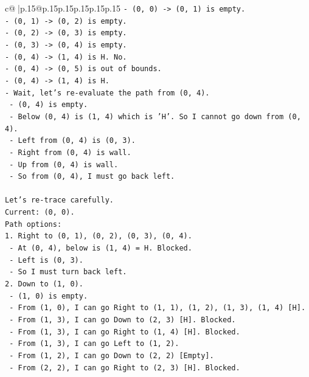 \documentclass{article}
\begin{document}
{\begin{supertabular}{c@{$\;$}|p{.15\linewidth}@{}p{.15\linewidth}p{.15\linewidth}p{.15\linewidth}p{.15\linewidth}p{.15\linewidth}}
{{{\texttt{{-} (0, 0) {-}> (0, 1) is empty.} \\
\texttt{{-} (0, 1) {-}> (0, 2) is empty.} \\
\texttt{{-} (0, 2) {-}> (0, 3) is empty.} \\
\texttt{{-} (0, 3) {-}> (0, 4) is empty.} \\
\texttt{{-} (0, 4) {-}> (1, 4) is H. No.} \\
\texttt{{-} (0, 4) {-}> (0, 5) is out of bounds.} \\
\texttt{{-} (0, 4) {-}> (1, 4) is H.} \\
\texttt{{-} Wait, let's re{-}evaluate the path from (0, 4).} \\
\texttt{  {-} (0, 4) is empty.} \\
\texttt{  {-} Below (0, 4) is (1, 4) which is 'H'. So I cannot go down from (0, 4).} \\
\texttt{  {-} Left from (0, 4) is (0, 3).} \\
\texttt{  {-} Right from (0, 4) is wall.} \\
\texttt{  {-} Up from (0, 4) is wall.} \\
\texttt{  {-} So from (0, 4), I must go back left.} \\
\\ 
\texttt{Let's re{-}trace carefully.} \\
\texttt{Current: (0, 0).} \\
\texttt{Path options:} \\
\texttt{1. Right to (0, 1), (0, 2), (0, 3), (0, 4).} \\
\texttt{   {-} At (0, 4), below is (1, 4) = H. Blocked.} \\
\texttt{   {-} Left is (0, 3).} \\
\texttt{   {-} So I must turn back left.} \\
\texttt{2. Down to (1, 0).} \\
\texttt{   {-} (1, 0) is empty.} \\
\texttt{   {-} From (1, 0), I can go Right to (1, 1), (1, 2), (1, 3), (1, 4) {[}H{]}.} \\
\texttt{   {-} From (1, 3), I can go Down to (2, 3) {[}H{]}. Blocked.} \\
\texttt{   {-} From (1, 3), I can go Right to (1, 4) {[}H{]}. Blocked.} \\
\texttt{   {-} From (1, 3), I can go Left to (1, 2).} \\
\texttt{   {-} From (1, 2), I can go Down to (2, 2) {[}Empty{]}.} \\
\texttt{   {-} From (2, 2), I can go Right to (2, 3) {[}H{]}. Blocked.} \\
}}}
\end{supertabular}}
\end{document}
